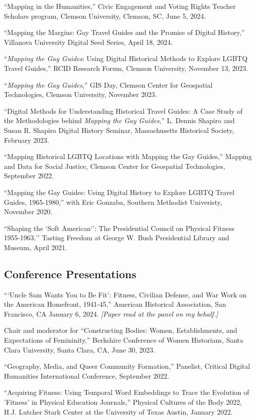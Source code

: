 \documentclass[11pt]{article}
\begin{document}
``Mapping in the Humanities,'' Civic Engagement and Voting Rights Teacher Scholars program, Clemson University, Clemson, SC, June 5, 2024.

``Mapping the Margins: Gay Travel Guides and the Promise of Digital History,'' Villanova University Digital Seed Series, April 18, 2024.

``\emph{Mapping the Gay Guides}: Using Digital Historical Methods to Explore LGBTQ Travel Guides,'' RCID Research Forum, Clemson University, November 13, 2023.

``\emph{Mapping the Gay Guides},'' GIS Day, Clemson Center for Geospatial Technologies, Clemson University, November 2023. 

``Digital Methods for Understanding Historical Travel Guides: A Case Study of the Methodologies behind \emph{Mapping the Gay Guides},'' L. Dennis Shapiro and Susan R. Shapiro Digital History Seminar, Massachusetts Historical Society, February 2023. 

``Mapping Historical LGBTQ Locations with Mapping the Gay Guides,'' Mapping and Data for Social Justice, Clemson Center for Geospatial Technologies, September 2022.

``Mapping the Gay Guides: Using Digital History to Explore LGBTQ Travel Guides, 1965-1980,'' with Eric Gonzaba, Southern Methodist Univeristy, November 2020.

``Shaping the `Soft American`': The Presidential Council on Physical Fitness 1955-1963,'' Tasting Freedom at George W. Bush Presidential Library and Museum, April 2021.

\subsection{Conference Presentations}
```Uncle Sam Wants You to Be Fit': Fitness, Civilian Defense, and War Work on the American Homefront, 1941-45,'' American Historical Association, San Francisco, CA January 6, 2024. \emph{[Paper read at the panel on my behalf.]}

Chair and moderator for ``Constructing Bodies: Women, Establishments, and Expectations of Femininity,'' Berkshire Conference of Women Historians, Santa Clara University, Santa Clara, CA, June 30, 2023.

``Geography, Media, and Queer Community Formation,'' Panelist, Critical Digital Humanities International Conference, September 2022.

``Acquiring Fitness: Using Temporal Word Embeddings to Trace the Evolution of 'Fitness' in Physical Education Journals,'' Physical Cultures of the Body 2022, H.J. Lutcher Stark Center at the University of Texas Austin, January 2022.
\end{document}
